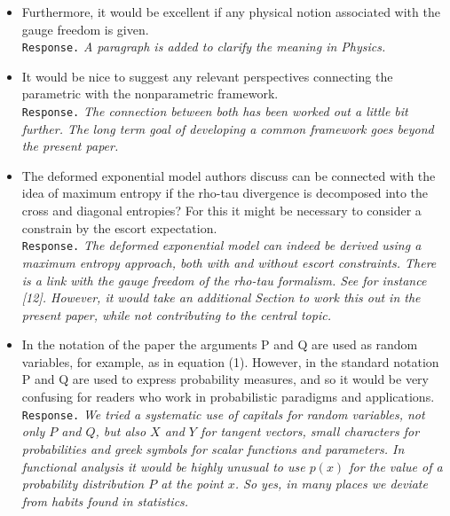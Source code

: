 \documentclass[a4paper,12pt]{article}
\begin{document}
\begin{itemize}
\item Furthermore, it would be excellent if any physical notion associated with the gauge freedom is given. \\
{\tt Response.} {\it  A paragraph is added to clarify the meaning in Physics. }

\item It would be nice to suggest any relevant perspectives connecting the parametric with the nonparametric framework. \\
{\tt Response.} {\it The connection between both has been worked out a little bit further. The long term goal
of developing a common framework goes beyond the present paper. }

\item The deformed exponential model authors discuss can be connected with the idea of maximum entropy if the rho-tau divergence is decomposed into the cross and diagonal entropies? For this it might be necessary to consider a constrain by the escort expectation. \\
{\tt Response.} {\it The deformed exponential model can indeed be derived using a maximum entropy approach, both
 with and without escort constraints. There is a link with the gauge freedom of the rho-tau formalism. See for 
 instance [12]. However, it would take an additional Section to work this out in the present paper, while not
 contributing to the central topic.
}

\item In the notation of the paper the arguments P and Q are used as random variables, for
example, as in equation (1). However, in the standard notation P and Q are used to express
probability measures, and so it would be very confusing for readers who work in probabilistic
paradigms and applications. \\
{\tt Response.} {\it We tried a systematic use of capitals for random variables, not only $P$ and $Q$, but also $X$ and $Y$ for tangent vectors, small characters for probabilities and greek symbols for
 scalar functions and parameters. In functional analysis it would be highly unusual to use $p(x)$
 for the value of a probability distribution $P$ at the point $x$. So yes, in  many places we deviate from
 habits found in statistics.
}

\end{itemize}
\end{document}
